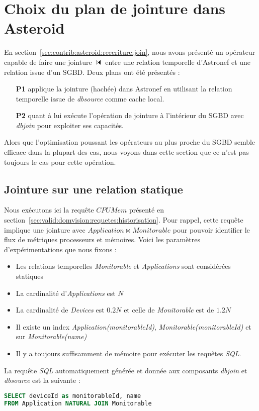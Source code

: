 \section{Choix du plan de jointure dans Asteroid}\label{sec:valid:perfs:couplage}
En section~\ref{sec:contrib:asteroid:reecriture:join}, nous avons présenté un opérateur capable de faire une jointure $\ssjoin$ entre une relation temporelle d'Astronef et une relation issue d'un SGBD. Deux plans ont été présentés : 
\begin{itemize}
	\item[\textbf{P1}] applique la jointure (hachée) dans Astronef en utilisant la relation temporelle issue de \textit{dbsource} comme cache local.
	\item[\textbf{P2}] quant à lui exécute l'opération de jointure à l'intérieur du SGBD avec \textit{dbjoin} pour exploiter ses capacités.
\end{itemize}
Alors que l'optimisation poussant les opérateurs au plus proche du SGBD semble efficace dans la plupart des cas, nous voyons dans cette section que ce n'est pas toujours le cas pour cette opération.

\subsection{Jointure sur une relation statique}
Nous exécutons ici la requête $CPUMem$ présenté en section~\ref{sec:valid:domvision:requetes:historisation}. Pour rappel, cette requête implique une jointure avec $Application \Join Monitorable$ pour pouvoir identifier le flux de métriques processeurs et mémoires. Voici les paramètres d'expérimentations que nous fixons :
\begin{itemize}
	\item Les relations temporelles \textit{Monitorable} et \textit{Applications} sont considérées statiques
	\item La cardinalité d'\textit{Applications} est $N$
	\item La cardinalité de \textit{Devices} est $0.2N$ et celle de \textit{Monitorable} est de $1.2N$
	\item Il existe un index \textit{Application(monitorableId)}, \textit{Monitorable(monitorableId)} et sur \textit{Monitorable(name)}
	\item Il y a toujours suffisamment de mémoire pour exécuter les requêtes \textit{SQL}.
\end{itemize}

La requête \textit{SQL} automatiquement générée et donnée aux composants \textit{dbjoin} et \textit{dbsource} est la suivante :
\begin{lstlisting}[language=SQL]
SELECT deviceId as monitorableId, name 
FROM Application NATURAL JOIN Monitorable
\end{lstlisting}

